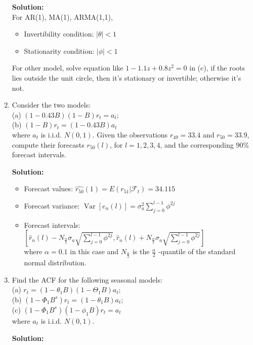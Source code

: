 \documentclass{article}
\begin{document}
\begin{enumerate}
	\textbf{Solution:}\\
	For AR(1), MA(1), ARMA(1,1),
	\begin{itemize}
		\item Invertibility condition: $|\theta| < 1$
		\item Stationarity condition: $|\phi| < 1$
	\end{itemize}
	For other model, solve equation like $1-1.1z+0.8z^2 = 0$ in (c), if the roots lies outside the unit circle, then it's stationary or invertible; otherwise it's not.
	
	\item Consider the two models:\\
	(a) $(1-0.43 B)(1-B) r_{t}=a_{t};$\\
	(b) $(1-B) r_{t}=(1-0.43 B) a_{t}$\\
	where $a_t$ is i.i.d. $N(0, 1)$. Given the observations $r_{49} = 33.4$ and	$r_{50} = 33.9$, compute their forecasts $r_{50}(l)$, for $l = 1,2,3,4$, and the corresponding $90\%$ forecast intervals.
	
	\textbf{Solution:}
	\begin{itemize}
		\item Forecast values: $\hat{r_{50}}(1) = E(r_{51} | \mathcal{F}_t) = 34.115$
		\item Forecast variance: $\operatorname{Var}\left[e_{n}(l)\right]=\sigma_{a}^{2} \sum_{j=0}^{l-1} \phi^{2 j}$
		\item Forecast intervals: $\left[\widehat{r}_{n}(l)-N_{\frac{\alpha}{2}} \sigma_{a} \sqrt{\sum_{j=0}^{l-1} \phi^{2 j}}, \widehat{r}_{n}(l)+N_{\frac{\alpha}{2}} \sigma_{a} \sqrt{\sum_{j=0}^{l-1} \phi^{2 j}}\right]$\\
		where $\alpha = 0.1$ in this case and $N_{\frac{\alpha}{2}}$ is the $\frac{\alpha}{2}$ -quantile of the standard normal distribution.
	\end{itemize}

	\item Find the ACF for the following seasonal models:\\
	(a) $r_{t}=\left(1-\theta_{1} B\right)\left(1-\Theta_{1} B\right) a_{t};$\\
	(b) $\left(1-\Phi_{1} B^{s}\right) r_{t}=\left(1-\theta_{1} B\right) a_{t};$\\
	(c) $\left(1-\Phi_{1} B^{s}\right)\left(1-\phi_{1} B\right) r_{t}=a_{t}$\\
	where $a_t$ is i.i.d. $N(0, 1)$.
	
	\textbf{Solution:}
	

\end{enumerate}
\end{document}

